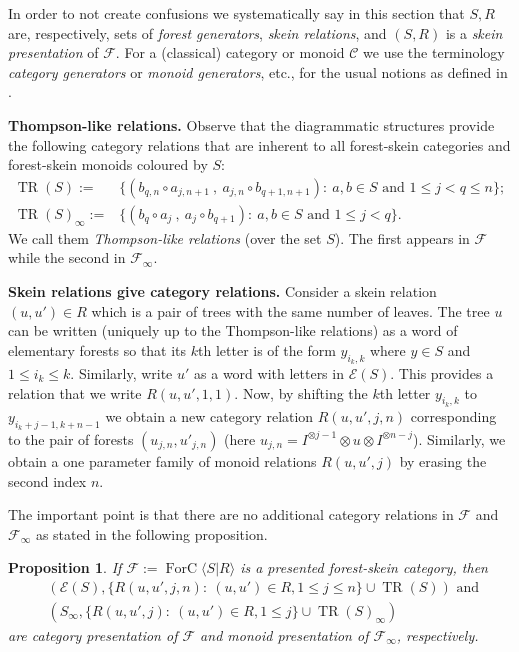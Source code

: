 \documentclass[a4paper, 12pt]{amsart}
\numberwithin{equation}{section}
\newtheorem{proposition}[theorem]{Proposition}
\theoremstyle{definition}
\newcommand{\cC}{\mathcal C}
\newcommand{\cE}{\mathcal E}
\newcommand{\cF}{\mathcal F}
\DeclareMathOperator{\FC}{ForC}
\newcommand{\ot}{\otimes}
\DeclareMathOperator{\TR}{TR}
\begin{document}
In order to not create confusions we systematically say in this section that $S,R$ are, respectively, sets of \textit{forest generators}, \textit{skein relations}, and $(S,R)$ is a \textit{skein presentation} of $\cF$.
For a (classical) category or monoid $\cC$ we use the terminology \textit{category generators} or {\it monoid generators}, etc., for the usual notions as defined in \cite[Section 1.4]{Dehornoy-book}.

{\bf Thompson-like relations.}
Observe that the diagrammatic structures provide the following category relations that are inherent to all forest-skein categories and forest-skein monoids coloured by $S$:
\begin{align}\label{eq:Thompson-relations}
\TR(S):=&\{(b_{q,n}\circ a_{j,n+1}\ , \ a_{j,n}\circ b_{q+1,n+1}):\ a,b\in S \text{ and } 1\leq j <q\leq n\};\\
\TR(S)_\infty:=&\{(b_{q}\circ a_{j}\ , \ a_{j}\circ b_{q+1}):\ a,b\in S \text{ and } 1\leq j <q\}.
\end{align}
We call them \textit{Thompson-like relations} (over the set $S$).
The first appears in $\cF$ while the second in $\cF_\infty$.

{\bf Skein relations give category relations.}
Consider a skein relation $(u,u')\in R$ which is a pair of trees with the same number of leaves.
The tree $u$ can be written (uniquely up to the Thompson-like relations) as a word of elementary forests so that its $k$th letter is of the form $y_{i_k,k}$ where $y\in S$ and $1\leq i_k\leq k$.
Similarly, write $u'$ as a word with letters in $\cE(S)$.
This provides a relation that we write $R(u,u',1,1)$.
Now, by shifting the $k$th letter $y_{i_k,k}$ to $y_{i_k+j-1, k+n-1}$ we obtain a new category relation $R(u,u',j,n)$ corresponding to the pair of forests $(u_{j,n},u'_{j,n})$ (here $u_{j,n}=I^{\ot j-1} \ot u\ot I^{\ot n-j}$).
Similarly, we obtain a one parameter family of monoid relations $R(u,u',j)$ by erasing the second index $n$.

The important point is that there are no additional category relations in $\cF$ and $\cF_\infty$ as stated in the following proposition.

\begin{proposition}\label{prop:universal-category}
If $\cF:=\FC\langle S| R\rangle$ is a presented forest-skein category, then 
\begin{align*}
&(\cE(S), \{ R(u,u',j,n):\ (u,u')\in R, 1\leq j\leq n\}\cup \TR(S)) \text{ and }\\
&(S_\infty, \{ R(u,u',j):\ (u,u')\in R, 1\leq j\}\cup \TR(S)_\infty)
\end{align*}
are category presentation of $\cF$ and monoid presentation of $\cF_\infty$, respectively.
\end{proposition}
\end{document}
